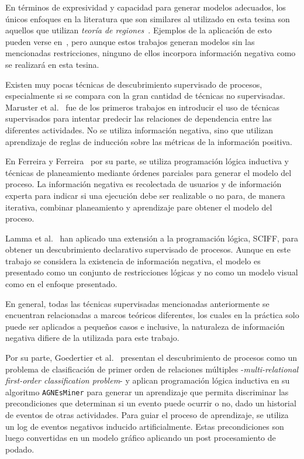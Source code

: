 En términos de expresividad y capacidad para generar modelos adecuados, los únicos enfoques en la literatura 
que son similares al utilizado en esta tesina son aquellos que utilizan \textit{teoría de regiones}~\cite{ehrenfeucht90, ehrenfeucht90a}.
Ejemplos de la aplicación de esto pueden verse en~\cite{Bergenthum07, van2008process, CarmonaCK10, SoleC11},
pero aunque estos trabajos generan modelos sin las mencionadas restricciones, ninguno de ellos incorpora
información negativa como se realizará en esta tesina.

Existen muy pocas técnicas de descubrimiento supervisado de procesos, especialmente si se compara
con la gran cantidad de técnicas no supervisadas. Maruster et al.~\cite{Maruster2006} fue de los 
primeros trabajos en introducir el uso de técnicas supervisados para intentar predecir las relaciones
de dependencia entre las diferentes actividades. No se utiliza información negativa, sino que
utilizan aprendizaje de reglas de inducción sobre las métricas de la información positiva.

En Ferreira y Ferreira~\cite{Ferreira2006} por su parte, se utiliza programación lógica inductiva
y técnicas de planeamiento mediante órdenes parciales para generar el modelo del proceso.
La información negativa es recolectada de usuarios y de información experta para indicar si una
ejecución debe ser realizable o no para, de manera iterativa, combinar planeamiento y aprendizaje
pare obtener el modelo del proceso.

Lamma et al.~\cite{Lamma2007,Lamma2008,alberti2008verifiable} han aplicado una extensión a la 
programación lógica, SCIFF, para obtener un descubrimiento declarativo supervisado de procesos.
Aunque en este trabajo se considera la existencia de información negativa, el modelo es presentado 
como un conjunto de restricciones lógicas y no como un modelo visual como en el enfoque presentado. 

En general, todas las técnicas supervisadas mencionadas anteriormente se encuentran relacionadas a 
marcos teóricos diferentes, los cuales en la práctica solo puede ser aplicados a pequeños casos e 
inclusive, la naturaleza de información negativa difiere de la utilizada para este trabajo.

Por su parte, Goedertier et al.~\cite{Goedertier2009} 
presentan el descubrimiento de procesos como un problema de clasificación de primer orden de relaciones
múltiples -\textit{multi-relational first-order classification problem}- y aplican programación lógica
inductiva en su algoritmo \texttt{AGNEsMiner} para generar un aprendizaje que permita discriminar
las precondiciones que determinan si un evento puede ocurrir o no, dado un historial de eventos
de otras actividades.  Para guiar el proceso de aprendizaje, se utiliza un log de eventos negativos 
inducido artificialmente. Estas precondiciones son luego convertidas en un modelo gráfico aplicando 
un post procesamiento de podado.

